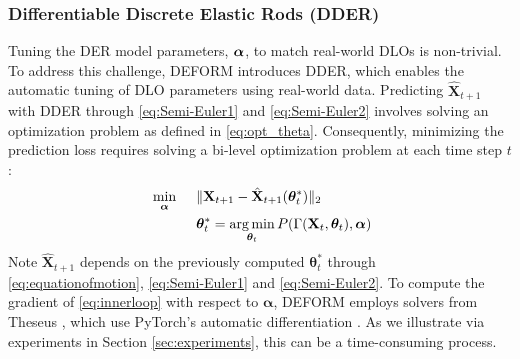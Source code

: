 \subsubsection{Differentiable Discrete Elastic Rods (DDER)}
Tuning the DER model parameters, $\bm{\alpha}$, to match real-world DLOs is non-trivial. 
To address this challenge, DEFORM introduces DDER, which enables the automatic tuning of DLO parameters using real-world data. 
Predicting $\hat{\textbf{X}}_{t+1}$ with DDER through \eqref{eq:Semi-Euler1} and \eqref{eq:Semi-Euler2} involves solving an optimization problem as defined in \eqref{eq:opt_theta}.
Consequently, minimizing the prediction loss requires solving a bi-level optimization problem at each time step $t$:
\begin{align}
    \label{eq:outerloop}
    &&\underset{\bm{\alpha}}{\min} \hspace{0.5cm}& \|\textbf{X}_{t+1}- \hat{\textbf{X}}_{t+1}(\bm{\theta}^*_t)\|_2 \hspace{1.5cm}    \\
    && & \bm{\theta}^*_t = \operatorname*{arg\,min}_{\bm{\theta}_t}   P(\Gamma(\textbf{X}_t, \bm{\theta}_t),\bm{\alpha})
    \label{eq:innerloop}
\end{align}
Note $\hat{\textbf{X}}_{t+1}$ depends on the previously computed $\bm{\theta}^*_t$ through \eqref{eq:equationofmotion}, \eqref{eq:Semi-Euler1} and \eqref{eq:Semi-Euler2}. 
To compute the gradient of \eqref{eq:innerloop} with respect to $\bm{\alpha}$, DEFORM employs solvers from Theseus \cite{theseus}, which use PyTorch’s automatic differentiation \cite{pytorch}. 
As we illustrate via experiments in Section \ref{sec:experiments}, this can be a time-consuming process.

